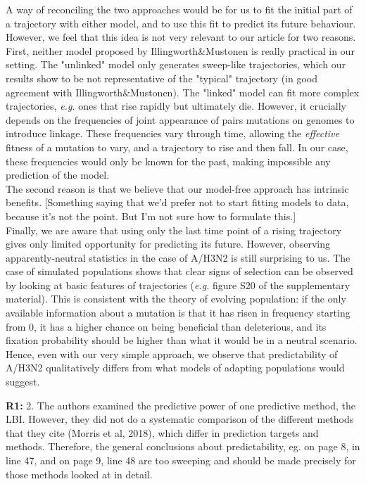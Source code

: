 \documentclass[aps,rmp,onecolumn]{revtex4-1}
\newcommand{\refa}[1]{\textbf{R1:} #1\vskip 5mm}
\begin{document}
{	A way of reconciling the two approaches would be for us to fit the initial part of a trajectory with either model, and to use this fit to predict its future behaviour. However, we feel that this idea is not very relevant to our article for two reasons. First, neither model proposed by Illingworth\&Mustonen is really practical in our setting. The "unlinked" model only generates sweep-like trajectories, which our results show to be not representative of the "typical" trajectory (in good agreement with Illingworth\&Mustonen). The "linked" model can fit more complex trajectories, \emph{e.g.} ones that rise rapidly but ultimately die. However, it crucially depends on the frequencies of joint appearance of pairs mutations on genomes to introduce linkage. These frequencies vary through time, allowing the \emph{effective} fitness of a mutation to vary, and a trajectory to rise and then fall. In our case, these frequencies would only be known for the past, making impossible any prediction of the model. \\
	The second reason is that we believe that our model-free approach has intrinsic benefits. [Something saying that we'd prefer not to start fitting models to  data, because it's not the point. But I'm not sure how to formulate this.] \\
	Finally, we are aware that using only the last time point of a rising trajectory gives only limited opportunity for predicting its future. However, observing apparently-neutral statistics in the case of A/H3N2 is still surprising to us. The case of simulated populations shows that clear signs of selection can be observed by looking at basic features of trajectories (\emph{e.g.} figure S20 of the supplementary material). This is consistent with the theory of evolving population: if the only available information about a mutation is that it has risen in frequency starting from $0$, it has a higher chance on being beneficial than deleterious, and its fixation probability should be higher than what it would be in a neutral scenario. Hence, even with our very simple approach, we observe that predictability of A/H3N2 qualitatively differs from what models of adapting populations would suggest. \\}

\refa{2. The authors examined the predictive power of one predictive
method, the LBI. However, they did not do a systematic comparison of
the different methods that they cite (Morris et al, 2018), which differ in prediction
targets and methods. Therefore, the general conclusions about
predictability, eg. on page 8, in line 47, and on page 9, line 48 are
too sweeping and should be made precisely for those methods looked at
in detail.}
\end{document}

